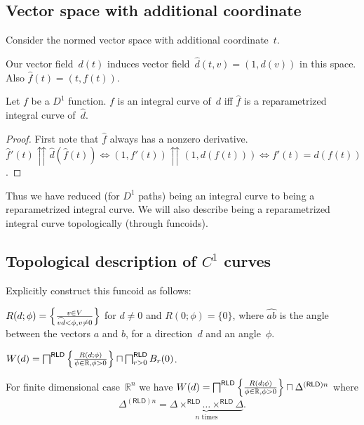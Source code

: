 \subsection{Vector space with additional coordinate}

Consider the normed vector space with additional coordinate~$t$.

Our vector field~$d(t)$ induces vector field~$\hat{d}(t,v)=(1,d(v))$ in this space. Also $\hat{f}(t)=(t,f(t))$.

\begin{prop}
Let $f$ be a $D^1$ function. $f$ is an integral curve of~$d$ iff $\hat{f}$ is a reparametrized integral curve of~$\hat{d}$.
\end{prop}

\begin{proof}
First note that $\hat{f}$ always has a nonzero derivative.
$\hat{f}'(t)\upuparrows \hat{d}(\hat{f}(t)) \Leftrightarrow (1,f'(t))\upuparrows (1,d(f(t))) \Leftrightarrow
f'(t)=d(f(t))$.
\end{proof}

Thus we have reduced (for $D^1$ paths) being an integral curve to being a reparametrized integral curve.
We will also describe being a reparametrized integral curve topologically (through funcoids).

\subsection{Topological description of $C^1$ curves}

Explicitly construct this funcoid as follows:

$R(d;\phi) = \left\{ \frac{v\in V}{\widehat{vd}<\phi, v\ne 0}\right\}$ for $d\ne 0$ and $R(0;\phi) = \{0\}$,
where $\widehat{ab}$ is the angle between the vectors $a$ and $b$,
for a direction~$d$ and an angle~$\phi$.

\begin{defn}
$W(d) = \bigsqcap^{\mathsf{RLD}}\left\{ \frac{R(d;\phi)}{\phi\in\mathbb{R},\phi>0}\right\} \sqcap \bigsqcap^{\mathsf{RLD}}_{r>0}B_r(0)$.
\end{defn}

\begin{prop}
For finite dimensional case~$\mathbb{R}^n$ we have
$W(d) = \bigsqcap^{\mathsf{RLD}}\left\{ \frac{R(d;\phi)}{\phi\in\mathbb{R},\phi>0}\right\} \sqcap \Delta^{(\mathsf{RLD})n}$
where \[ \Delta^{(\mathsf{RLD})n} = \underbrace{\Delta\times^{\mathsf{RLD}}\dots\times^{\mathsf{RLD}}\Delta}_{n\text{ times}}. \]
\end{prop}

